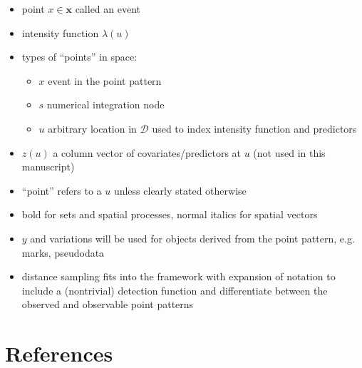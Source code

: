 \documentclass[review]{elsarticle}
\begin{document}
\begin{itemize}
\item point \(x \in \mathbf{x}\) called an event

\item intensity function \(\lambda(u)\)

\item types of ``points'' in space:
\begin{itemize}
\item \(x\) event in the point pattern
\item \(s\) numerical integration node
\item \(u\) arbitrary location in \(\mathcal{D}\) used to index intensity
function and predictors
\end{itemize}

\item \(z(u)\) a column vector of covariates/predictors at \(u\) (not used in
this manuscript)

\item ``point'' refers to a \(u\) unless clearly stated otherwise

\item bold for sets and spatial processes, normal italics for spatial vectors

\item \(y\) and variations will be used for objects derived from the point
pattern, e.g. marks, pseudodata

\item distance sampling fits into the framework with expansion of notation
to include a (nontrivial) detection function and differentiate between the
observed and observable point patterns

\end{itemize}




\section*{References}


\end{document}
